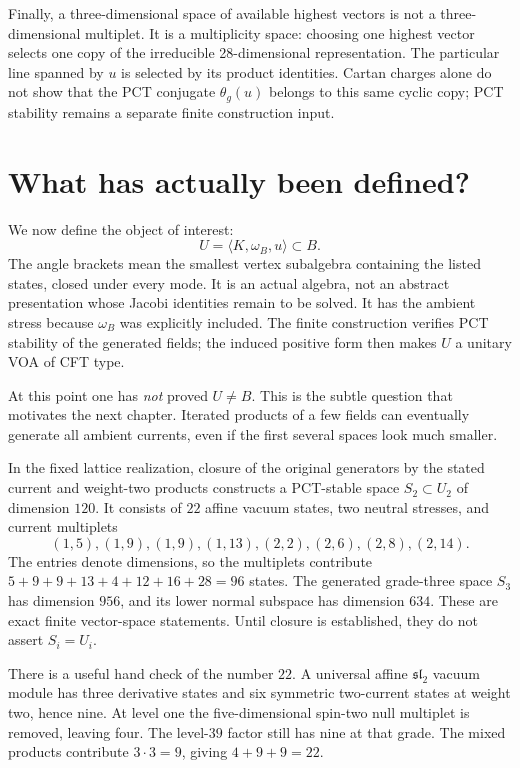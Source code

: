 \begin{example}
Finally, a three-dimensional space of available highest vectors is
not a three-dimensional multiplet. It is a multiplicity space:
choosing one highest vector selects one copy of the irreducible
28-dimensional representation. The particular line spanned by $u$
is selected by its product identities. Cartan charges alone do not
show that the PCT conjugate $\theta_g(u)$ belongs to this same cyclic
copy; PCT stability remains a separate finite construction input.
\end{example}

\section{What has actually been defined?}

We now define the object of interest:
\begin{equation}\label{eq:c-U-definition}
 U=\langle K,\omega_B,u\rangle\subset B.
\end{equation}
The angle brackets mean the smallest vertex subalgebra containing the
listed states, closed under every mode. It is an actual algebra, not
an abstract presentation whose Jacobi identities remain to be solved.
It has the ambient stress because $\omega_B$ was explicitly included.
The finite construction verifies PCT stability of the generated fields;
the induced positive form then makes $U$ a unitary VOA of CFT type.

At this point one has \emph{not} proved $U\ne B$. This is the subtle
question that motivates the next chapter. Iterated products of a few
fields can eventually generate all ambient currents, even if the first
several spaces look much smaller.

\begin{constructioninput}
In the fixed lattice realization, closure of the original generators
by the stated current and weight-two products constructs a PCT-stable
space $S_2\subset U_2$ of dimension $120$. It consists of $22$ affine
vacuum states, two neutral stresses, and current multiplets
\[
 (1,5),(1,9),(1,9),(1,13),(2,2),(2,6),(2,8),(2,14).
\]
The entries denote dimensions, so the multiplets contribute
$5+9+9+13+4+12+16+28=96$ states. The generated grade-three space
$S_3$ has dimension $956$, and its lower normal subspace has dimension
$634$. These are exact finite vector-space statements. Until closure
is established, they do not assert $S_i=U_i$.
\end{constructioninput}

There is a useful hand check of the number $22$. A universal affine
$\mathfrak{sl}_2$ vacuum module has three derivative states and six
symmetric two-current states at weight two, hence nine. At level one
the five-dimensional spin-two null multiplet is removed, leaving four.
The level-$39$ factor still has nine at that grade. The mixed products
contribute $3\cdot3=9$, giving $4+9+9=22$.

